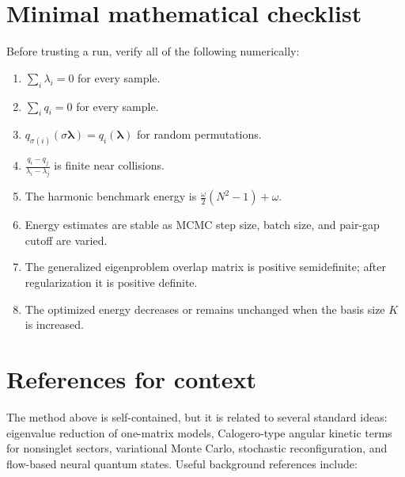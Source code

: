 \documentclass[11pt]{article}
\begin{document}
\section{Minimal mathematical checklist}

Before trusting a run, verify all of the following numerically:
\begin{enumerate}[label=(\arabic*)]
\item $\sum_i\lambda_i=0$ for every sample.
\item $\sum_iq_i=0$ for every sample.
\item $q_{\sigma(i)}(\sigma\bm\lambda)=q_i(\bm\lambda)$ for random permutations.
\item $\frac{q_i-q_j}{\lambda_i-\lambda_j}$ is finite near collisions.
\item The harmonic benchmark energy is $\frac\omega2(N^2-1)+\omega$.
\item Energy estimates are stable as MCMC step size, batch size, and pair-gap cutoff are varied.
\item The generalized eigenproblem overlap matrix is positive semidefinite; after regularization it is positive definite.
\item The optimized energy decreases or remains unchanged when the basis size $K$ is increased.
\end{enumerate}

\section{References for context}

The method above is self-contained, but it is related to several standard ideas: eigenvalue reduction of one-matrix models, Calogero-type angular kinetic terms for nonsinglet sectors, variational Monte Carlo, stochastic reconfiguration, and flow-based neural quantum states.  Useful background references include:
\end{document}
